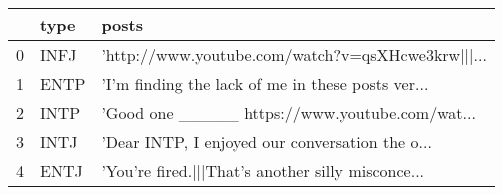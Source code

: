 \begin{tabular}{lll}
\toprule
{} &  type &                                              posts \\
\midrule
0 &  INFJ &  'http://www.youtube.com/watch?v=qsXHcwe3krw|||... \\
1 &  ENTP &  'I'm finding the lack of me in these posts ver... \\
2 &  INTP &  'Good one  \_\_\_\_\_   https://www.youtube.com/wat... \\
3 &  INTJ &  'Dear INTP,   I enjoyed our conversation the o... \\
4 &  ENTJ &  'You're fired.|||That's another silly misconce... \\
\bottomrule
\end{tabular}
